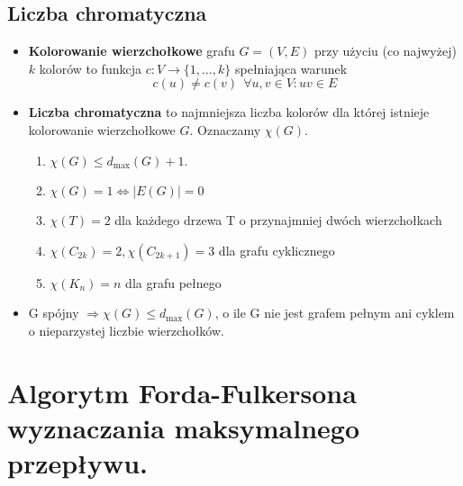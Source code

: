 \documentclass[main.tex]{subfiles}
\begin{document}
    \subsection{Liczba chromatyczna}

    \begin{itemize}
        \item \textbf{Kolorowanie wierzchołkowe} grafu $G = (V, E)$ przy użyciu (co najwyżej) $k$
        kolorów to funkcja $c: V \rightarrow \{1, \dots, k\}$ spełniająca warunek
        \[c(u) \neq c(v) ~~ \forall u, v \in V : uv \in E\]

        \item \textbf{Liczba chromatyczna} to najmniejsza liczba kolorów dla
        której istnieje kolorowanie wierzchołkowe $G$. Oznaczamy $\chi(G)$.
        \begin{enumerate}
            \item $\chi(G) \leq d_{\max}(G) + 1$.
            \item $\chi(G) = 1 \Leftrightarrow |E(G)| = 0$
            \item $\chi(T) = 2$ dla każdego drzewa T o przynajmniej dwóch wierzchołkach
            \item $\chi(C_{2k}) = 2, \chi(C_{2k+1}) = 3$ dla grafu cyklicznego
            \item $\chi(K_n) = n$ dla grafu pełnego
        \end{enumerate}

        \item G spójny $\Rightarrow \chi(G) \leq d_{\max}(G)$, o ile G nie jest grafem pełnym ani cyklem o
        nieparzystej liczbie wierzchołków.
    \end{itemize}


    \section{Algorytm Forda-Fulkersona wyznaczania maksymalnego przepływu.}
\end{document}

